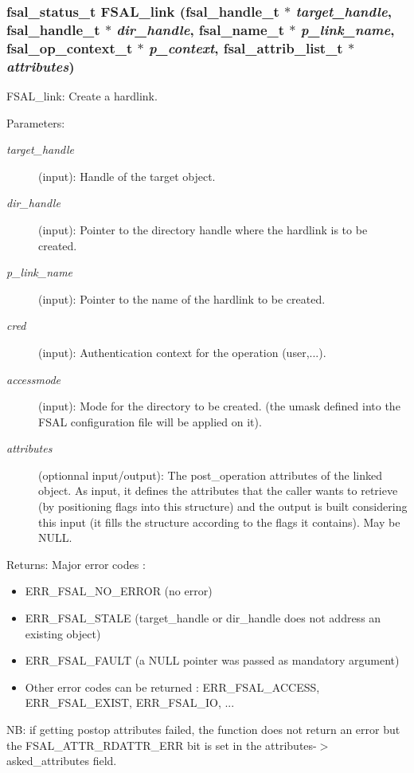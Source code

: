 \subsubsection[{FSAL\_\-link}]{\setlength{\rightskip}{0pt plus 5cm}fsal\_\-status\_\-t FSAL\_\-link (fsal\_\-handle\_\-t $\ast$ {\em target\_\-handle}, \/  fsal\_\-handle\_\-t $\ast$ {\em dir\_\-handle}, \/  fsal\_\-name\_\-t $\ast$ {\em p\_\-link\_\-name}, \/  fsal\_\-op\_\-context\_\-t $\ast$ {\em p\_\-context}, \/  fsal\_\-attrib\_\-list\_\-t $\ast$ {\em attributes})}\label{fsal__create_8c_b835d0f160323a78d0512a5254e9c109}


FSAL\_\-link: Create a hardlink.

\begin{Desc}
\item[Parameters:]
\begin{description}
\item[{\em target\_\-handle}](input): Handle of the target object. \item[{\em dir\_\-handle}](input): Pointer to the directory handle where the hardlink is to be created. \item[{\em p\_\-link\_\-name}](input): Pointer to the name of the hardlink to be created. \item[{\em cred}](input): Authentication context for the operation (user,...). \item[{\em accessmode}](input): Mode for the directory to be created. (the umask defined into the FSAL configuration file will be applied on it). \item[{\em attributes}](optionnal input/output): The post\_\-operation attributes of the linked object. As input, it defines the attributes that the caller wants to retrieve (by positioning flags into this structure) and the output is built considering this input (it fills the structure according to the flags it contains). May be NULL.\end{description}
\end{Desc}
\begin{Desc}
\item[Returns:]Major error codes :\begin{itemize}
\item ERR\_\-FSAL\_\-NO\_\-ERROR (no error)\item ERR\_\-FSAL\_\-STALE (target\_\-handle or dir\_\-handle does not address an existing object)\item ERR\_\-FSAL\_\-FAULT (a NULL pointer was passed as mandatory argument)\item Other error codes can be returned : ERR\_\-FSAL\_\-ACCESS, ERR\_\-FSAL\_\-EXIST, ERR\_\-FSAL\_\-IO, ...\end{itemize}
\end{Desc}
NB: if getting postop attributes failed, the function does not return an error but the FSAL\_\-ATTR\_\-RDATTR\_\-ERR bit is set in the attributes-$>$asked\_\-attributes field. 

